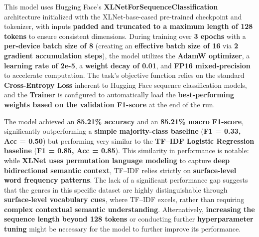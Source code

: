 This model uses Hugging Face's \textbf{XLNetForSequenceClassification} architecture initialized with the XLNet-base-cased pre-trained checkpoint and tokenizer, with inputs \textbf{padded and truncated to a maximum length of 128 tokens} to ensure consistent dimensions. During training over \textbf{3 epochs} with a \textbf{per-device batch size of 8} (creating an \textbf{effective batch size of 16} via \textbf{2 gradient accumulation steps}), the model utilizes the \textbf{AdamW optimizer}, a \textbf{learning rate of 2e-5}, a \textbf{weight decay of 0.01}, and \textbf{FP16 mixed-precision} to accelerate computation. The task's objective function relies on the standard \textbf{Cross-Entropy Loss} inherent to Hugging Face sequence classification models, and the \textbf{Trainer} is configured to automatically load the \textbf{best-performing weights based on the validation F1-score} at the end of the run.

The model achieved an \textbf{85.21\% accuracy} and an \textbf{85.21\% macro F1-score}, significantly outperforming a \textbf{simple majority-class baseline} (\textbf{F1 = 0.33, Acc = 0.50}) but performing very similar to the \textbf{TF--IDF Logistic Regression baseline} (\textbf{F1 = 0.85, Acc = 0.85}). This similarity in performance is notable: while \textbf{XLNet uses permutation language modeling} to capture \textbf{deep bidirectional semantic context}, TF--IDF relies strictly on \textbf{surface-level word frequency patterns}. The lack of a significant performance gap suggests that the genres in this specific dataset are highly distinguishable through \textbf{surface-level vocabulary cues}, where TF--IDF excels, rather than requiring \textbf{complex contextual semantic understanding}. Alternatively, \textbf{increasing the sequence length beyond 128 tokens} or conducting further \textbf{hyperparameter tuning} might be necessary for the model to further improve its performance.